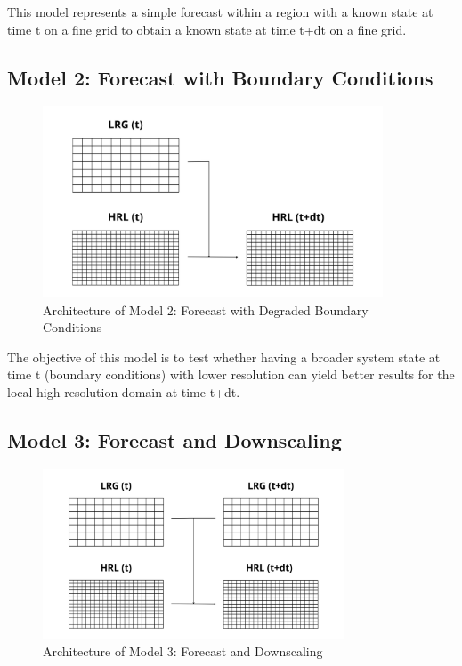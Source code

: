 This model represents a simple forecast within a region with a known state at time t on a fine grid to obtain a known state at time t+dt on a fine grid.

\subsection{Model 2: Forecast with Boundary Conditions}

\begin{figure}[ht]
\centering
\includegraphics[width=0.9\textwidth]{media/model2.png}
\caption{Architecture of Model 2: Forecast with Degraded Boundary Conditions}
\label{fig}
\end{figure}

The objective of this model is to test whether having a broader system state at time t (boundary conditions) with lower resolution can yield better results for the local high-resolution domain at time t+dt.

\subsection{Model 3: Forecast and Downscaling}

\begin{figure}[ht]
\centering
\includegraphics[width=0.8\textwidth]{media/model3.png}
\caption{Architecture of Model 3: Forecast and Downscaling}
\label{fig}
\end{figure}

